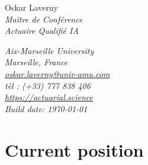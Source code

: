 \documentclass[a4paper,11pt]{article}
\newcommand*{\namefont}{\fontsize{28}{30}\mdseries\upshape}
\newcommand*{\titlefont}{\LARGE\mdseries\slshape}
\newcommand*{\addressfont}{\small\mdseries\slshape}
\newcommand*{\namestyle}[1]{{\namefont\textcolor{color0}{#1}}}
\newcommand*{\titlestyle}[1]{{\titlefont\textcolor{color2}{#1}}}
\newcommand*{\addressstyle}[1]{{\addressfont\textcolor{color2}{#1}}}
\begin{document}
\begin{multicols}{2}\raggedright
\namestyle{Oskar Laverny} \\
\vspace{0.5cm}
\titlestyle{Maître de Conférence}\\
\vspace{0.2cm}
\titlestyle{Actuaire Qualifié IA}
\columnbreak

\raggedleft
\addressstyle{
Aix-Marseille University\\
Marseille, France\\
\url{oskar.laverny@univ-amu.com}\\
tèl : (+33) 777 838 406\\
\url{https://actuarial.science}\\
Build date: \today
}
\end{multicols}
\vspace{0.2cm}
\section{Current position}\label{subsec:act_pro_actuelle}
\end{document}
